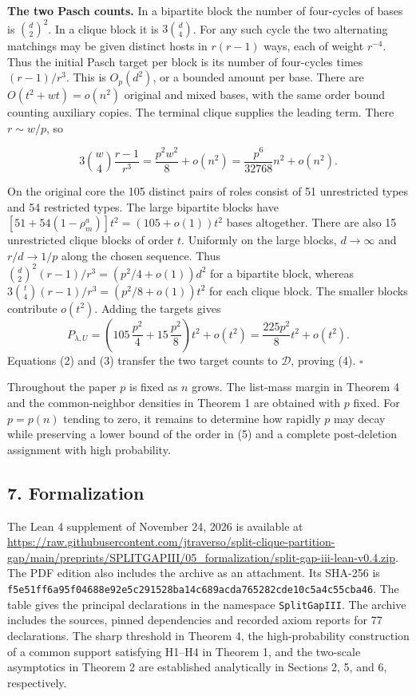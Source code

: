\documentclass[english,11pt,a4paper]{article}
\begin{document}
\textbf{The two Pasch counts.} In a bipartite block the number of four-cycles of bases is \(\binom d2^2\). In a clique block it is \(3\binom d4\). For any such cycle the two alternating matchings may be given distinct hosts in \(r(r-1)\) ways, each of weight \(r^{-4}\). Thus the initial Pasch target per block is its number of four-cycles times \((r-1)/r^3\). This is \(O_p(d^2)\), or a bounded amount per base. There are \(O(t^2+wt)=o(n^2)\) original and mixed bases, with the same order bound counting auxiliary copies. The terminal clique supplies the leading term. There \(r\sim w/p\), so

\[3\binom w4\frac{r-1}{r^3}
   =\frac{p^2w^2}{8}+o(n^2)
   =\frac{p^6}{32768}n^2+o(n^2).\]

On the original core the 105 distinct pairs of roles consist of 51 unrestricted types and 54 restricted types. The large bipartite blocks have \([51+54(1-\rho_m^a)]t^2=(105+o(1))t^2\) bases altogether. There are also 15 unrestricted clique blocks of order \(t\). Uniformly on the large blocks, \(d\to\infty\) and \(r/d\to1/p\) along the chosen sequence. Thus \(\binom d2^2(r-1)/r^3=(p^2/4+o(1))d^2\) for a bipartite block, whereas \(3\binom t4(r-1)/r^3=(p^2/8+o(1))t^2\) for each clique block. The smaller blocks contribute \(o(t^2)\). Adding the targets gives \[P_{\lambda,U}=\left(105\,\frac{p^2}{4}+15\,\frac{p^2}{8}\right)t^2+o(t^2)
=\frac{225p^2}{8}t^2+o(t^2).\] Equations (2) and (3) transfer the two target counts to \(\mathcal D\), proving (4). \(\square\)

Throughout the paper \(p\) is fixed as \(n\) grows. The list-mass margin in Theorem 4 and the common-neighbor densities in Theorem 1 are obtained with \(p\) fixed. For \(p=p(n)\) tending to zero, it remains to determine how rapidly \(p\) may decay while preserving a lower bound of the order in (5) and a complete post-deletion assignment with high probability.

\subsection{7. Formalization}\label{formalization}

The Lean 4 supplement of November 24, 2026 is available at \url{https://raw.githubusercontent.com/jtraverso/split-clique-partition-gap/main/preprints/SPLITGAPIII/05_formalization/split-gap-iii-lean-v0.4.zip}. The PDF edition also includes the archive as an attachment. Its SHA-256 is \nolinkurl{f5e51ff6a95f04688e92e5c291528ba14c689acda765282cde10c5a4c55cba46}. The table gives the principal declarations in the namespace \texttt{SplitGapIII}. The archive includes the sources, pinned dependencies and recorded axiom reports for 77 declarations. The sharp threshold in Theorem 4, the high-probability construction of a common support satisfying H1--H4 in Theorem 1, and the two-scale asymptotics in Theorem 2 are established analytically in Sections 2, 5, and 6, respectively.
\end{document}
